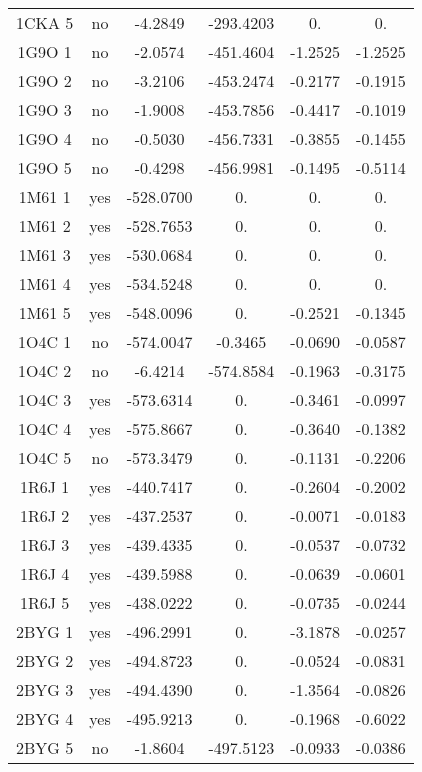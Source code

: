 \begin{table}[h]
{\begin{tabular}{cccccc}
        1CKA 5 & no   &  -4.2849   & -293.4203  & 0.      & 0. \\           
        1G9O 1 & no   &  -2.0574   & -451.4604  & -1.2525 & -1.2525 \\ 
        1G9O 2 & no   &  -3.2106   & -453.2474  & -0.2177 & -0.1915 \\ 
        1G9O 3 & no   &  -1.9008   & -453.7856  & -0.4417 & -0.1019 \\ 
        1G9O 4 & no   &  -0.5030   & -456.7331  & -0.3855 & -0.1455 \\ 
        1G9O 5 & no   &  -0.4298   & -456.9981  & -0.1495 & -0.5114 \\ 
        1M61 1 & yes  & -528.0700 & 0.          & 0.      & 0. \\               
        1M61 2 & yes  & -528.7653 & 0.          & 0.      & 0. \\               
        1M61 3 & yes  & -530.0684 & 0.           & 0.      & 0. \\               
        1M61 4 & yes  & -534.5248 & 0.           & 0.     & 0.\\               
        1M61 5 & yes  & -548.0096 & 0.           & -0.2521 & -0.1345 \\     
        1O4C 1 & no   &  -574.0047 & -0.3465     & -0.0690 & -0.0587 \\    
        1O4C 2 & no   &  -6.4214   & -574.8584   & -0.1963 & -0.3175 \\         
        1O4C 3 & yes  & -573.6314 &  0.          & -0.3461 & -0.0997 \\             
        1O4C 4 & yes  & -575.8667 &  0.          & -0.3640 & -0.1382 \\             
        1O4C 5 & no   & -573.3479 &  0.          & -0.1131 & -0.2206 \\      
        1R6J 1 & yes  & -440.7417 &  0.          & -0.2604 & -0.2002 \\        
        1R6J 2 & yes  & -437.2537 &  0.          & -0.0071 & -0.0183 \\        
        1R6J 3 & yes  & -439.4335 &  0.          & -0.0537 & -0.0732 \\       
        1R6J 4 & yes  & -439.5988 &  0.          & -0.0639 & -0.0601 \\        
        1R6J 5 & yes  & -438.0222 &  0.          & -0.0735 & -0.0244 \\        
        2BYG 1 & yes  & -496.2991 &  0.          & -3.1878 & -0.0257 \\        
        2BYG 2 & yes  & -494.8723 &  0.          & -0.0524 & -0.0831 \\        
        2BYG 3 & yes  & -494.4390 &  0.          & -1.3564 & -0.0826 \\        
        2BYG 4 & yes  & -495.9213 &  0.          & -0.1968 & -0.6022 \\        
        2BYG 5 & no   &  -1.8604   & -497.5123   & -0.0933 & -0.0386 \\   
       \bottomrule



\end{tabular}}
\end{table}
